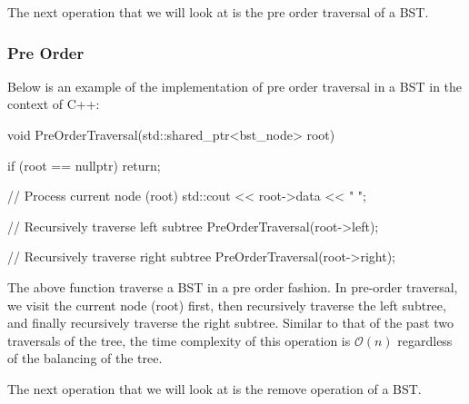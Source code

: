 The next operation that we will look at is the pre order traversal of a BST.

\begin{highlight}

\subsubsection*{Pre Order}

Below is an example of the implementation of pre order traversal in a BST in the context of C++:

\begin{code}
void PreOrderTraversal(std::shared_ptr<bst_node> root) {
    if (root == nullptr)
        return;

    // Process current node (root)
    std::cout << root->data << " ";

    // Recursively traverse left subtree
    PreOrderTraversal(root->left);

    // Recursively traverse right subtree
    PreOrderTraversal(root->right);
}
\end{code}

\noindent The above function traverse a BST in a pre order fashion. In pre-order traversal, we visit the current node (root) first, then recursively traverse the left subtree, and finally recursively 
traverse the right subtree. Similar to that of the past two traversals of the tree, the time complexity of this operation is $\mathcal{O}(n)$ regardless of the balancing of the tree.

\end{highlight}

The next operation that we will look at is the remove operation of a BST.

